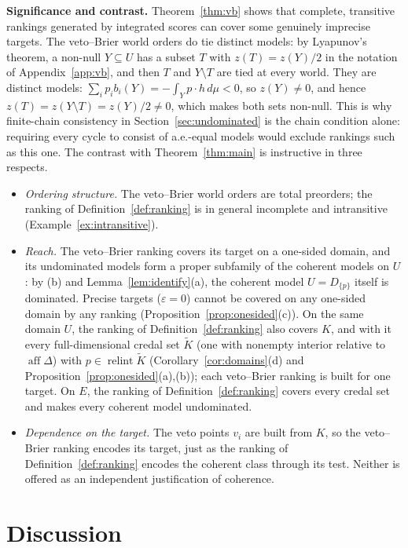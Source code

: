 \documentclass[11pt]{article}
\DeclareMathOperator{\relint}{relint}
\DeclareMathOperator{\aff}{aff}
\theoremstyle{plain}
\theoremstyle{definition}
\theoremstyle{remark}
\begin{document}
\smallskip\noindent\textbf{Significance and contrast.} Theorem~\ref{thm:vb} shows that complete,
transitive rankings generated by integrated scores can cover some genuinely imprecise targets.
The veto--Brier world orders do tie distinct models: by Lyapunov's theorem, a non-null $Y
\subseteq U$ has a subset $T$ with $z(T)=z(Y)/2$ in the notation of Appendix~\ref{app:vb}, and
then $T$ and $Y\setminus T$ are tied at every world. They are distinct models: $\sum_ip_i
b_i(Y)=-\int_Yp\cdot h\,d\mu<0$, so $z(Y)\ne0$, and hence $z(T)=z(Y\setminus T)=z(Y)/2\ne0$,
which makes both sets non-null. This is why finite-chain consistency in
Section~\ref{sec:undominated} is the chain condition alone: requiring every cycle to consist of
a.e.-equal models would exclude rankings such as this one. The contrast with
Theorem~\ref{thm:main} is instructive in three respects.
\begin{itemize}
  \item \emph{Ordering structure.} The veto--Brier world orders are total preorders; the ranking of
  Definition~\ref{def:ranking} is in general incomplete and intransitive
  (Example~\ref{ex:intransitive}).
  \item \emph{Reach.} The veto--Brier ranking covers its target on a one-sided domain, and its
  undominated models form a proper subfamily of the coherent models on $U$: by (b) and
  Lemma~\ref{lem:identify}(a), the coherent model $U=D_{\{p\}}$ itself is dominated. Precise
  targets ($\varepsilon=0$) cannot be covered on any one-sided domain by any ranking
  (Proposition~\ref{prop:onesided}(c)). On the same domain $U$, the ranking of
  Definition~\ref{def:ranking} also covers $K$, and with it every full-dimensional credal set $\tilde K$ (one with nonempty
  interior relative to $\aff\Delta$) with $p\in\relint\tilde K$ (Corollary~\ref{cor:domains}(d) and
  Proposition~\ref{prop:onesided}(a),(b)); each veto--Brier ranking is built for one target.
  On $E$, the ranking of Definition~\ref{def:ranking} covers every credal set and makes every
  coherent model undominated.
  \item \emph{Dependence on the target.} The veto points $v_i$ are built from $K$, so the
  veto--Brier ranking encodes its target, just as the ranking of Definition~\ref{def:ranking}
  encodes the coherent class through its test. Neither is offered as an independent justification of coherence.
\end{itemize}

\section{Discussion}\label{sec:discussion}
\end{document}
